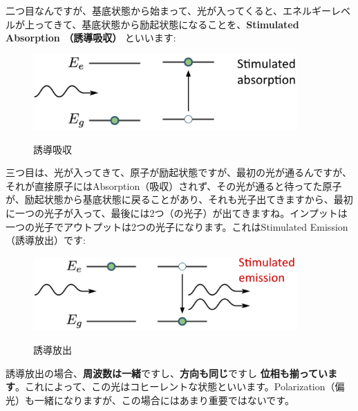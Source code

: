 二つ目なんですが、基底状態から始まって、光が入ってくると、エネルギーレベルが上ってきて、基底状態から励起状態になることを、\textbf{Stimulated Absorption （誘導吸収）} といいます:
\begin{figure}[H]
    \centering
    \includegraphics[width=0.9\textwidth]{lesson5/stimulated_absorption.pdf}
    \label{図: 1}
    \caption{誘導吸収}
\end{figure}

三つ目は、光が入ってきて、原子が励起状態ですが、最初の光が通るんですが、それが直接原子にはAbsorption（吸収）されず、その光が通ると待ってた原子が、励起状態から基底状態に戻ることがあり、それも光子出てきますから、最初に一つの光子が入って、最後には2つ（の光子）が出てきますね。インプットは一つの光子でアウトプットは2つの光子になります。これはStimulated Emission （誘導放出）です:
\begin{figure}[H]
    \centering
    \includegraphics[width=0.9\textwidth]{lesson5/stimulated_emission.pdf}
    \label{図: 1}
    \caption{誘導放出}
\end{figure}

誘導放出の場合、\textbf{周波数は一緒}ですし、\textbf{方向も同じ}ですし
\textbf{位相も揃っています}。これによって、この光はコヒーレントな状態といいます。Polarization（偏光）も一緒になりますが、この場合にはあまり重要ではないです。


